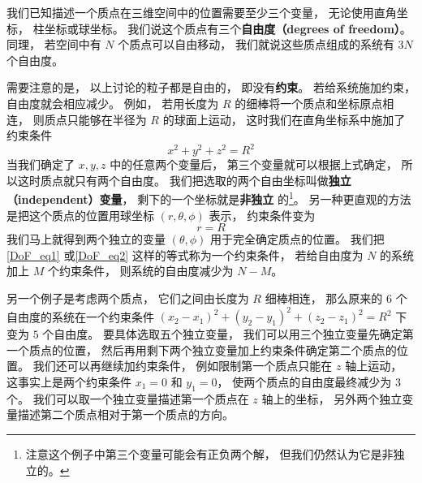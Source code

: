 

我们已知描述一个质点在三维空间中的位置需要至少三个变量， 无论使用直角坐标， 柱坐标或球坐标。 我们说这个质点有三个\textbf{自由度（degrees of freedom）}。 同理， 若空间中有 $N$ 个质点可以自由移动， 我们就说这些质点组成的系统有 $3N$ 个自由度。

需要注意的是， 以上讨论的粒子都是自由的， 即没有\textbf{约束}。 若给系统施加约束， 自由度就会相应减少。 例如， 若用长度为 $R$ 的细棒将一个质点和坐标原点相连， 则质点只能够在半径为 $R$ 的球面上运动， 这时我们在直角坐标系中施加了约束条件
\begin{equation}\label{DoF_eq1}
x^2 + y^2 + z^2 = R^2
\end{equation}
当我们确定了 $x, y, z$ 中的任意两个变量后， 第三个变量就可以根据上式确定， 所以这时质点就只有两个自由度。 我们把选取的两个自由坐标叫做\textbf{独立（independent）变量}， 剩下的一个坐标就是\textbf{非独立} 的\footnote{注意这个例子中第三个变量可能会有正负两个解， 但我们仍然认为它是非独立的。}。 另一种更直观的方法是把这个质点的位置用球坐标 $(r, \theta, \phi)$ 表示， 约束条件变为
\begin{equation}\label{DoF_eq2}
r = R
\end{equation}
我们马上就得到两个独立的变量 $(\theta, \phi)$ 用于完全确定质点的位置。 我们把\autoref{DoF_eq1} 或\autoref{DoF_eq2} 这样的等式称为一个约束条件， 若给自由度为 $N$ 的系统加上 $M$ 个约束条件， 则系统的自由度减少为 $N - M$。

另一个例子是考虑两个质点， 它们之间由长度为 $R$ 细棒相连， 那么原来的 $6$ 个自由度的系统在一个约束条件 $(x_2 - x_1)^2 + (y_2 - y_1)^2 + (z_2 - z_1)^2 = R^2$ 下变为 $5$ 个自由度。 要具体选取五个独立变量， 我们可以用三个独立变量先确定第一个质点的位置， 然后再用剩下两个独立变量加上约束条件确定第二个质点的位置。 我们还可以再继续加约束条件， 例如限制第一个质点只能在 $z$ 轴上运动， 这事实上是两个约束条件 $x_1 = 0$ 和 $y_1 = 0$， 使两个质点的自由度最终减少为 3 个。 我们可以取一个独立变量描述第一个质点在 $z$ 轴上的坐标， 另外两个独立变量描述第二个质点相对于第一个质点的方向。


